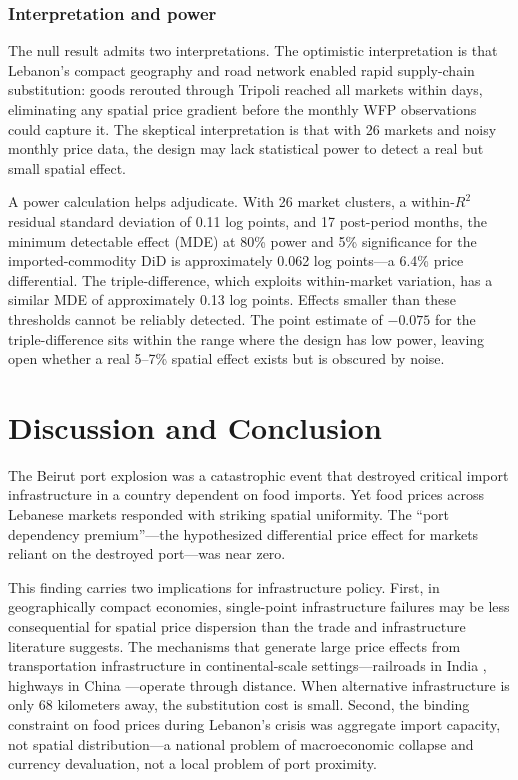 \documentclass[12pt]{article}
\begin{document}
\subsubsection*{Interpretation and power} The null result admits two interpretations. The optimistic interpretation is that Lebanon's compact geography and road network enabled rapid supply-chain substitution: goods rerouted through Tripoli reached all markets within days, eliminating any spatial price gradient before the monthly WFP observations could capture it. The skeptical interpretation is that with 26 markets and noisy monthly price data, the design may lack statistical power to detect a real but small spatial effect.

A power calculation helps adjudicate. With 26 market clusters, a within-$R^2$ residual standard deviation of 0.11 log points, and 17 post-period months, the minimum detectable effect (MDE) at 80\% power and 5\% significance for the imported-commodity DiD is approximately 0.062 log points---a 6.4\% price differential. The triple-difference, which exploits within-market variation, has a similar MDE of approximately 0.13 log points. Effects smaller than these thresholds cannot be reliably detected. The point estimate of $-0.075$ for the triple-difference sits within the range where the design has low power, leaving open whether a real 5--7\% spatial effect exists but is obscured by noise.

\section{Discussion and Conclusion}\label{sec:conclusion}

The Beirut port explosion was a catastrophic event that destroyed critical import infrastructure in a country dependent on food imports. Yet food prices across Lebanese markets responded with striking spatial uniformity. The ``port dependency premium''---the hypothesized differential price effect for markets reliant on the destroyed port---was near zero.

This finding carries two implications for infrastructure policy. First, in geographically compact economies, single-point infrastructure failures may be less consequential for spatial price dispersion than the trade and infrastructure literature suggests. The mechanisms that generate large price effects from transportation infrastructure in continental-scale settings---railroads in India \citep{donaldson2018railroads}, highways in China \citep{faber2014trade}---operate through distance. When alternative infrastructure is only 68 kilometers away, the substitution cost is small. Second, the binding constraint on food prices during Lebanon's crisis was aggregate import capacity, not spatial distribution---a national problem of macroeconomic collapse and currency devaluation, not a local problem of port proximity.
\end{document}
